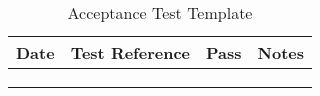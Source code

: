\begin{table}[h]
\centering
\begin{tabular}{|l|l|l|l|}
\hline
\textbf{Date} & \textbf{Test Reference} & \textbf{Pass} & \textbf{Notes} \\ \hline
              &                         &               &                \\ \hline
              &                         &               &                \\ \hline
              &                         &               &                \\ \hline
\end{tabular}
\caption{Acceptance Test Template \protect {\label{tab:acc_test_template}}}
\end{table}